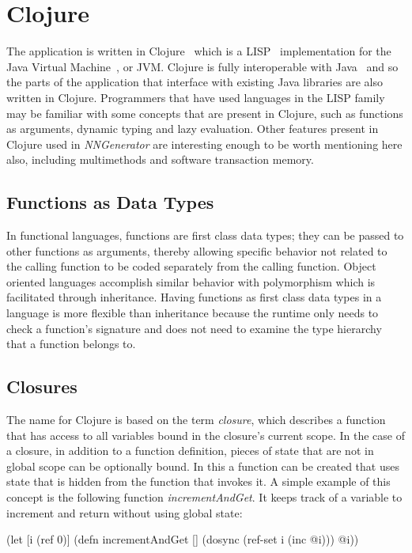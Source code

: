 \section{Clojure}
The application is written in Clojure~\cite{clj} which is a LISP~\cite{lisp} implementation for the Java Virtual Machine~\cite{jvm}, or JVM. 
Clojure is fully interoperable with Java~\cite{java} and so the parts of the application that interface with existing Java libraries are also written in Clojure.
Programmers that have used languages in the LISP family may be familiar with some concepts that are present in Clojure, such as
functions as arguments, dynamic typing and lazy evaluation. 
Other features present in Clojure used in {\em NNGenerator} are interesting enough to be worth mentioning here also, including multimethods and software transaction memory.

\subsection{Functions as Data Types}
In functional languages, functions are first class data types; they
can be passed to other functions as arguments, thereby allowing specific behavior not related to the calling function to be coded
separately from the calling function. 
Object oriented languages accomplish similar behavior with polymorphism which is
facilitated through inheritance. 
Having functions as first class data types in a language is more
flexible than inheritance because the runtime only needs to check a
function's signature and does not need to examine the type hierarchy
that a function belongs to.   

\subsection{Closures}
The name for Clojure is based on the term {\it closure}, which
describes a function that has access to all variables bound in the
closure's current scope. 
In the case of a closure, in addition to a function definition, pieces
of state that are not in global scope can be optionally bound. 
In this a function can be created that uses state that is hidden
from the function that invokes it.
A simple example of this concept is the following function {\it incrementAndGet}.
It keeps track of a variable to increment and return without using
global state: 

(let [i (ref 0)]
  (defn incrementAndGet []
     (dosync (ref-set i (inc @i))) @i))

